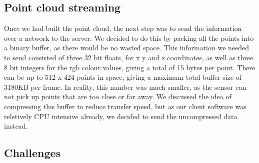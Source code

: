 \documentclass{article}
\begin{document}
\subsection{Point cloud streaming}
Once we had built the point cloud, the next step was to send the information over a network to the server. We decided to do this by packing all the points into a binary buffer, as there would be no wasted space. This information we needed to send consisted of three 32 bit floats, for x y and z coordinates, as well as three 8 bit integers for the rgb colour values, giving a total of 15 bytes per point. There can be up to 512 x 424 points in space, giving a maximum total buffer size of 3180KB per frame. In reality, this number was much smaller, as the sensor can not pick up points that are too close or far away. We discussed the idea of compressing this buffer to reduce transfer speed, but as our client software was reletively CPU intensive already, we decided to send the uncompressed data instead.

\subsection{Challenges}
\end{document}
